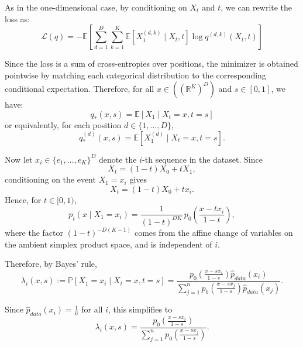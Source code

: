 \documentclass{article}
\begin{document}
As in the one-dimensional case, by conditioning on $X_t$ and $t$, we can rewrite the loss as:
\begin{equation}
    \mathcal{L}(q)
    =
    -\mathbb{E}\left[
        \sum_{d=1}^{D} \sum_{k=1}^{K}
        \mathbb{E}\left[X_1^{(d,k)} \mid X_t, t\right]
        \log q^{(d,k)}(X_t,t)
    \right]
\end{equation}

Since the loss is a sum of cross-entropies over positions, the minimizer is obtained pointwise by matching each categorical distribution to the corresponding conditional expectation. Therefore, for all $x \in ((\mathbb{R}^K)^D)$ and $s \in [0,1]$, we have:
\begin{equation}
    q_*(x,s)
    =
    \mathbb{E}[X_1 \mid X_t = x, t = s]
\end{equation}
or equivalently, for each position $d \in \{1,\dots,D\}$,
\begin{equation}
    q_*^{(d)}(x,s)
    =
    \mathbb{E}[X_1^{(d)} \mid X_t = x, t = s].
\end{equation}

Now let $x_i \in \{e_1,\dots,e_K\}^D$ denote the $i$-th sequence in the dataset. Since
\begin{equation}
    X_t = (1-t)X_0 + tX_1,
\end{equation}
conditioning on the event $X_1 = x_i$ gives
\begin{equation}
    X_t = (1-t)X_0 + t x_i.
\end{equation}
Hence, for $t \in [0,1)$,
\begin{equation}
    p_t(x \mid X_1 = x_i)
    =
    \frac{1}{(1-t)^{DK}}\,
    p_0\!\left(\frac{x - t x_i}{1-t}\right),
\end{equation}
where the factor $(1-t)^{-D(K-1)}$ comes from the affine change of variables on the ambient simplex product space, and is independent of $i$.

Therefore, by Bayes' rule,
\begin{equation}
    \lambda_i(x,s)
    :=
    \mathbb{P}[X_1 = x_i \mid X_t = x, t = s]
    =
    \frac{
        p_0\!\left(\frac{x - s x_i}{1-s}\right)\hat{p}_{data}(x_i)
    }{
        \sum_{j=1}^{n}
        p_0\!\left(\frac{x - s x_j}{1-s}\right)\hat{p}_{data}(x_j)
    }.
\end{equation}

Since $\hat{p}_{data}(x_i)=\frac{1}{n}$ for all $i$, this simplifies to
\begin{equation}
    \lambda_i(x,s)
    =
    \frac{
        p_0\!\left(\frac{x - s x_i}{1-s}\right)
    }{
        \sum_{j=1}^{n}
        p_0\!\left(\frac{x - s x_j}{1-s}\right)
    }.
\end{equation}
\end{document}
